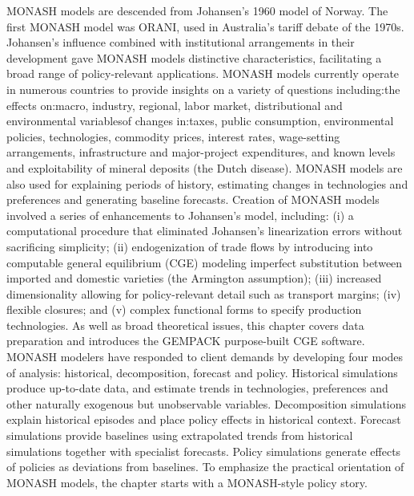 MONASH models are descended from Johansen's 1960 model of Norway. The first MONASH model was ORANI, used in Australia's tariff debate of the 1970s. Johansen's influence combined with institutional arrangements in their development gave MONASH models distinctive characteristics, facilitating a broad range of policy-relevant applications. MONASH models currently operate in numerous countries to provide insights on a variety of questions including:the effects on:macro, industry, regional, labor market, distributional and environmental variablesof changes in:taxes, public consumption, environmental policies, technologies, commodity prices, interest rates, wage-setting arrangements, infrastructure and major-project expenditures, and known levels and exploitability of mineral deposits (the Dutch disease). MONASH models are also used for explaining periods of history, estimating changes in technologies and preferences and generating baseline forecasts. Creation of MONASH models involved a series of enhancements to Johansen's model, including: (i) a computational procedure that eliminated Johansen's linearization errors without sacrificing simplicity; (ii) endogenization of trade flows by introducing into computable general equilibrium (CGE) modeling imperfect substitution between imported and domestic varieties (the Armington assumption); (iii) increased dimensionality allowing for policy-relevant detail such as transport margins; (iv) flexible closures; and (v) complex functional forms to specify production technologies. As well as broad theoretical issues, this chapter covers data preparation and introduces the GEMPACK purpose-built CGE software. MONASH modelers have responded to client demands by developing four modes of analysis: historical, decomposition, forecast and policy. Historical simulations produce up-to-date data, and estimate trends in technologies, preferences and other naturally exogenous but unobservable variables. Decomposition simulations explain historical episodes and place policy effects in historical context. Forecast simulations provide baselines using extrapolated trends from historical simulations together with specialist forecasts. Policy simulations generate effects of policies as deviations from baselines. To emphasize the practical orientation of MONASH models, the chapter starts with a MONASH-style policy story.